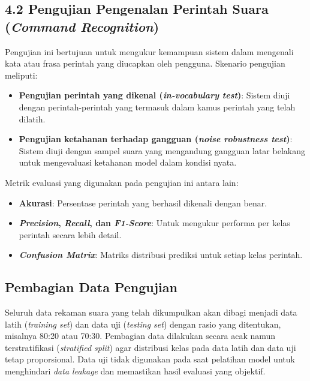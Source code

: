 \subsection*{4.2 Pengujian Pengenalan Perintah Suara (\textit{Command Recognition})}

Pengujian ini bertujuan untuk mengukur kemampuan sistem dalam mengenali kata atau frasa perintah yang diucapkan oleh pengguna. Skenario pengujian meliputi:

\begin{itemize}
    \item \textbf{Pengujian perintah yang dikenal (\textit{in-vocabulary test})}: Sistem diuji dengan perintah-perintah yang termasuk dalam kamus perintah yang telah dilatih.
    \item \textbf{Pengujian ketahanan terhadap gangguan (\textit{noise robustness test})}: Sistem diuji dengan sampel suara yang mengandung gangguan latar belakang untuk mengevaluasi ketahanan model dalam kondisi nyata.
\end{itemize}

Metrik evaluasi yang digunakan pada pengujian ini antara lain:
\begin{itemize}
    \item \textbf{Akurasi}: Persentase perintah yang berhasil dikenali dengan benar.
    \item \textbf{\textit{Precision}, \textit{Recall}, dan \textit{F1-Score}}: Untuk mengukur performa per kelas perintah secara lebih detail.
    \item \textbf{\textit{Confusion Matrix}}: Matriks distribusi prediksi untuk setiap kelas perintah.
\end{itemize}

\subsection*{Pembagian Data Pengujian}

Seluruh data rekaman suara yang telah dikumpulkan akan dibagi menjadi data latih (\textit{training set}) dan data uji (\textit{testing set}) dengan rasio yang ditentukan, misalnya 80:20 atau 70:30. Pembagian data dilakukan secara acak namun terstratifikasi (\textit{stratified split}) agar distribusi kelas pada data latih dan data uji tetap proporsional. Data uji tidak digunakan pada saat pelatihan model untuk menghindari \textit{data leakage} dan memastikan hasil evaluasi yang objektif.
